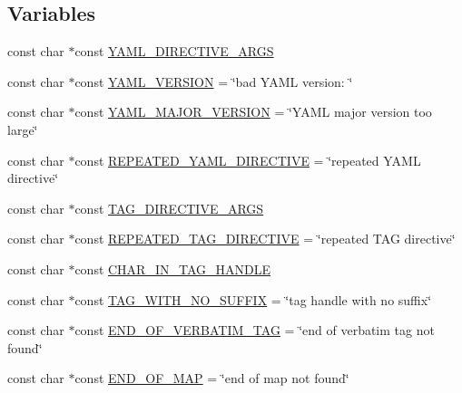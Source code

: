 \subsection*{Variables}
\begin{DoxyCompactItemize}
\item 
const char $\ast$const \mbox{\hyperlink{namespace_y_a_m_l_1_1_error_msg_af55c5005be860b9b41659055df5c13f1}{Y\+A\+M\+L\+\_\+\+D\+I\+R\+E\+C\+T\+I\+V\+E\+\_\+\+A\+R\+GS}}
\item 
const char $\ast$const \mbox{\hyperlink{namespace_y_a_m_l_1_1_error_msg_a6e7998d0efedc5cab142baaa7c9bffba}{Y\+A\+M\+L\+\_\+\+V\+E\+R\+S\+I\+ON}} = \char`\"{}bad Y\+A\+ML version\+: \char`\"{}
\item 
const char $\ast$const \mbox{\hyperlink{namespace_y_a_m_l_1_1_error_msg_ad1b6b0d991e09c1ad42e704f13d45e2c}{Y\+A\+M\+L\+\_\+\+M\+A\+J\+O\+R\+\_\+\+V\+E\+R\+S\+I\+ON}} = \char`\"{}Y\+A\+ML major version too large\char`\"{}
\item 
const char $\ast$const \mbox{\hyperlink{namespace_y_a_m_l_1_1_error_msg_a7ab08aea1a9971d744ae02c720327e23}{R\+E\+P\+E\+A\+T\+E\+D\+\_\+\+Y\+A\+M\+L\+\_\+\+D\+I\+R\+E\+C\+T\+I\+VE}} = \char`\"{}repeated Y\+A\+ML directive\char`\"{}
\item 
const char $\ast$const \mbox{\hyperlink{namespace_y_a_m_l_1_1_error_msg_a085c8edd1f05aaf337a6a93fb73ae3af}{T\+A\+G\+\_\+\+D\+I\+R\+E\+C\+T\+I\+V\+E\+\_\+\+A\+R\+GS}}
\item 
const char $\ast$const \mbox{\hyperlink{namespace_y_a_m_l_1_1_error_msg_ac5d40ed5fd4dff239e5e8e74deed64f7}{R\+E\+P\+E\+A\+T\+E\+D\+\_\+\+T\+A\+G\+\_\+\+D\+I\+R\+E\+C\+T\+I\+VE}} = \char`\"{}repeated T\+AG directive\char`\"{}
\item 
const char $\ast$const \mbox{\hyperlink{namespace_y_a_m_l_1_1_error_msg_a3b005e55aa1f024e0426314db76aeb5e}{C\+H\+A\+R\+\_\+\+I\+N\+\_\+\+T\+A\+G\+\_\+\+H\+A\+N\+D\+LE}}
\item 
const char $\ast$const \mbox{\hyperlink{namespace_y_a_m_l_1_1_error_msg_a7e7ad93b916f79eb02546d06405697d7}{T\+A\+G\+\_\+\+W\+I\+T\+H\+\_\+\+N\+O\+\_\+\+S\+U\+F\+F\+IX}} = \char`\"{}tag handle with no suffix\char`\"{}
\item 
const char $\ast$const \mbox{\hyperlink{namespace_y_a_m_l_1_1_error_msg_aae2fec70d0404ff3f0a8796f3359ea34}{E\+N\+D\+\_\+\+O\+F\+\_\+\+V\+E\+R\+B\+A\+T\+I\+M\+\_\+\+T\+AG}} = \char`\"{}end of verbatim tag not found\char`\"{}
\item 
const char $\ast$const \mbox{\hyperlink{namespace_y_a_m_l_1_1_error_msg_aca2bc86288e21315bcea4856429be3cc}{E\+N\+D\+\_\+\+O\+F\+\_\+\+M\+AP}} = \char`\"{}end of map not found\char`\"{}

\end{DoxyCompactItemize}
